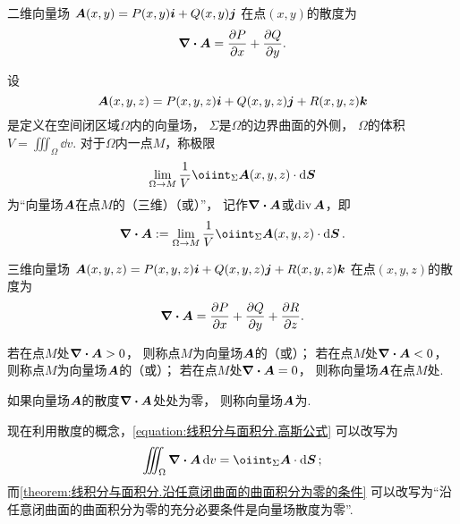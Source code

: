 \begin{proposition}
二维向量场
\(\boldsymbol{A}(x,y)=P(x,y)\boldsymbol{i}+Q(x,y)\boldsymbol{j}\)
在点\((x,y)\)的散度为\[
	\div{\boldsymbol{A}} = \pdv{P}{x}+\pdv{Q}{y}.
\]
\end{proposition}

\begin{definition}[空间中的散度]
\def\defofdiv{\lim_{\Omega \to M} \frac{1}{V} \oiint_\Sigma \vb{A}(x,y,z) \cdot \dd{\vb{S}}}%
设\[
	\boldsymbol{A}(x,y,z)=P(x,y,z)\boldsymbol{i}+Q(x,y,z)\boldsymbol{j}+R(x,y,z)\boldsymbol{k}
\]是定义在空间闭区域\(\Omega\)内的向量场，
\(\Sigma\)是\(\Omega\)的边界曲面的外侧，
\(\Omega\)的体积\(V = \iiint_\Omega \dd{v}\).
对于\(\Omega\)内一点\(M\)，称极限\[
	\defofdiv
\]为“向量场\(\boldsymbol{A}\)在点\(M\)的（三维）（或）”，
记作\(\div{\boldsymbol{A}}\)或\(\operatorname{div}\boldsymbol{A}\)，即\[
	\div{\vb{A}} \defeq \defofdiv.
\]
\end{definition}

\begin{proposition}
三维向量场
\(\boldsymbol{A}(x,y,z)=P(x,y,z)\boldsymbol{i}+Q(x,y,z)\boldsymbol{j}+R(x,y,z)\boldsymbol{k}\)
在点\((x,y,z)\)的散度为\[
	\div{\boldsymbol{A}}
	= \pdv{P}{x}+\pdv{Q}{y}+\pdv{R}{z}.
\]
\end{proposition}

\begin{definition}
若在点\(M\)处\(\div{\boldsymbol{A}}>0\)，
则称点\(M\)为向量场\(\boldsymbol{A}\)的（或）；
若在点\(M\)处\(\div{\boldsymbol{A}}<0\)，
则称点\(M\)为向量场\(\boldsymbol{A}\)的（或）；
若在点\(M\)处\(\div{\boldsymbol{A}}=0\)，
则称向量场\(\boldsymbol{A}\)在点\(M\)处.

如果向量场\(\boldsymbol{A}\)的散度\(\div{\boldsymbol{A}}\)处处为零，
则称向量场\(\boldsymbol{A}\)为.
\end{definition}

现在利用散度的概念，\cref{equation:线积分与面积分.高斯公式} 可以改写为
\begin{equation}\label{equation:线积分与面积分.高斯公式1}
	\iiint_\Omega \div{\vb{A}} \dd{v}
	= \oiint_\Sigma \vb{A} \cdot \dd{\vb{S}};
\end{equation}
而\cref{theorem:线积分与面积分.沿任意闭曲面的曲面积分为零的条件}
可以改写为“沿任意闭曲面的曲面积分为零的充分必要条件是向量场散度为零”.

